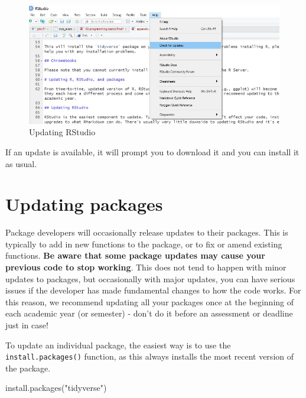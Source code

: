 \documentclass[
  oneside]{book}
\newenvironment{Shaded}{\begin{snugshade}}{\end{snugshade}}
\newcommand{\FunctionTok}[1]{\textcolor[rgb]{0.00,0.00,0.00}{#1}}
\newcommand{\NormalTok}[1]{#1}
\newcommand{\StringTok}[1]{\textcolor[rgb]{0.31,0.60,0.02}{#1}}
\begin{document}
\begin{figure}

{\centering \includegraphics[width=1\linewidth]{images/update_rstudio} 

}

\caption{Updating RStudio}\label{fig:img-updaterstudio}
\end{figure}

If an update is available, it will prompt you to download it and you can install it as usual.

\hypertarget{updating-packages}{%
\section{Updating packages}\label{updating-packages}}

Package developers will occasionally release updates to their packages. This is typically to add in new functions to the package, or to fix or amend existing functions. \textbf{Be aware that some package updates may cause your previous code to stop working}. This does not tend to happen with minor updates to packages, but occasionally with major updates, you can have serious issues if the developer has made fundamental changes to how the code works. For this reason, we recommend updating all your packages once at the beginning of each academic year (or semester) - don't do it before an assessment or deadline just in case!

To update an individual package, the easiest way is to use the \texttt{install.packages()} function, as this always installs the most recent version of the package.

\begin{Shaded}
\begin{Highlighting}[]
\FunctionTok{install.packages}\NormalTok{(}\StringTok{"tidyverse"}\NormalTok{)}
\end{Highlighting}
\end{Shaded}
\end{document}
